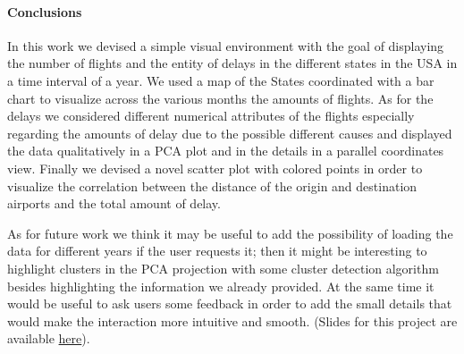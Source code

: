 \documentclass[a4paper, 12pt]{article}
\begin{document}
\paragraph*{Conclusions}
In this work we devised a simple visual environment with the goal of displaying the number of flights 
and the entity of delays in the different states in the USA in a time interval of a year. We used a map
of the States coordinated with a bar chart to visualize across the various months the amounts of flights.
As for the delays we considered different numerical attributes of the flights especially regarding the
amounts of delay due to the possible different causes and displayed the data qualitatively in a PCA plot
and in the details in a parallel coordinates view. Finally we devised a novel scatter plot with colored
points in order to visualize the correlation between the distance of the origin and destination airports
and the total amount of delay.

As for future work we think it may be useful to add the possibility of loading the data for different
years if the user requests it; then it might be interesting to highlight clusters in the PCA projection
with some cluster detection algorithm besides highlighting the information we already provided. At the 
same time it would be useful to ask users some feedback in order to add the small details that would
make the interaction more intuitive and smooth.
(Slides for this project are available 
\href{https://docs.google.com/presentation/d/1T_p1oarqUuNt5APTaf7IwTJEzUDJC0CoNfJKHdak0so/edit?usp=sharing}{here}).
\end{document}
